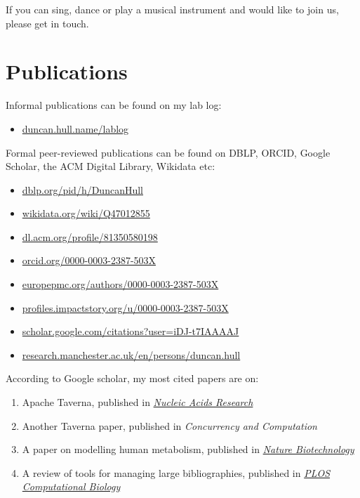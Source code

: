 \documentclass[
  12pt,
]{book}
\providecommand{\tightlist}{%
  \setlength{\itemsep}{0pt}\setlength{\parskip}{0pt}}
\begin{document}
If you can sing, dance or play a musical instrument and would like to join us, please get in touch.

\section{Publications}\label{publications}

Informal publications can be found on my lab log:

\begin{itemize}
\tightlist
\item
  \href{https://duncan.hull.name/lablog/}{duncan.hull.name/lablog}
\end{itemize}

Formal peer-reviewed publications can be found on DBLP, ORCID, Google Scholar, the ACM Digital Library, Wikidata etc:

\begin{itemize}
\tightlist
\item
  \href{https://dblp.org/pid/h/DuncanHull}{dblp.org/pid/h/DuncanHull}
\item
  \href{https://www.wikidata.org/wiki/Q47012855}{wikidata.org/wiki/Q47012855}
\item
  \href{https://dl.acm.org/profile/81350580198}{dl.acm.org/profile/81350580198}
\item
  \href{https://orcid.org/0000-0003-2387-503X}{orcid.org/0000-0003-2387-503X}
\item
  \href{https://europepmc.org/authors/0000-0003-2387-503X}{europepmc.org/authors/0000-0003-2387-503X}
\item
  \href{https://profiles.impactstory.org/u/0000-0003-2387-503X}{profiles.impactstory.org/u/0000-0003-2387-503X}
\item
  \href{https://scholar.google.com/citations?user=iDJ-t7IAAAAJ}{scholar.google.com/citations?user=iDJ-t7IAAAAJ}
\item
  \href{https://research.manchester.ac.uk/en/persons/duncan.hull}{research.manchester.ac.uk/en/persons/duncan.hull}
\end{itemize}

According to Google scholar, my most cited papers are on:

\begin{enumerate}
\def\labelenumi{\arabic{enumi}.}
\tightlist
\item
  Apache Taverna, published in \href{https://en.wikipedia.org/wiki/Nucleic_Acids_Research}{\emph{Nucleic Acids Research}} \citep{taverna}\\
\item
  Another Taverna paper, published in \emph{Concurrency and Computation} \citep{Oinn2006}\\
\item
  A paper on modelling human metabolism, published in \href{https://en.wikipedia.org/wiki/Nature_Biotechnology}{\emph{Nature Biotechnology}} \citep{Thiele2013}
\item
  A review of tools for managing large bibliographies, published in \href{https://en.wikipedia.org/wiki/PLOS_Computational_Biology}{\emph{PLOS Computational Biology}} \citep{defrosting}
\end{enumerate}
\end{document}

